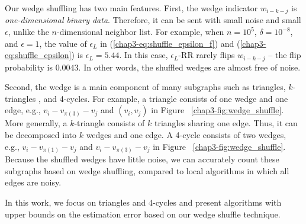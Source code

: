 Our wedge shuffling has two main features. 
First, 
the wedge indicator $w_{i-k-j}$ is \textit{one-dimensional binary data}. 
Therefore, it can be sent with small noise and small $\epsilon$, unlike the $n$-dimensional neighbor list. 
For example, when $n=10^5$, $\delta=10^{-8}$, and $\epsilon=1$, the value of $\epsilon_L$ in (\ref{chap3-eq:shuffle_epsilon_f}) and (\ref{chap3-eq:shuffle_epsilon}) is $\epsilon_L = 5.44$. 
In this case, $\epsilon_L$-RR rarely flips $w_{i-k-j}$ -- the flip probability is $0.0043$. 
In other words, the shuffled wedges are almost free of noise. 

Second, the wedge is a main component of many subgraphs such as triangles, $k$-triangles \cite{Karwa_PVLDB11}, and 4-cycles. 
For example, a triangle consists of one wedge and one edge, e.g., $v_i-v_{\pi(3)}-v_j$ and $(v_i, v_j)$ in Figure ~\ref{chap3-fig:wedge_shuffle}. 
More generally, a $k$-triangle consists of $k$ triangles sharing one edge. 
Thus, it can be decomposed into $k$ wedges and one edge. 
A 4-cycle consists of two wedges, e.g., $v_i-v_{\pi(1)}-v_j$ and $v_i-v_{\pi(3)}-v_j$ in Figure ~\ref{chap3-fig:wedge_shuffle}. 
Because the shuffled wedges have little noise, we can accurately count these subgraphs based on wedge shuffling, compared to local algorithms in which all edges are noisy. 

In this work, we focus on triangles and 4-cycles and 
present algorithms with upper bounds on the estimation error based on our wedge shuffle technique. 



